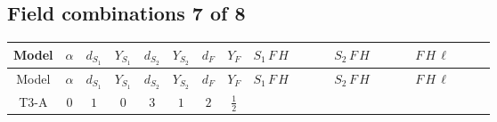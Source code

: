\documentclass[8pt]{article}
\begin{document}
\begin{landscape}
\subsection*{Field combinations 7 of 8}
\begin{longtable}{@{}cccccccc >{\raggedright\arraybackslash}p{0.21\linewidth} >{\raggedright\arraybackslash}p{0.21\linewidth} >{\raggedright\arraybackslash}p{0.21\linewidth}@{}}
\toprule
Model & $\alpha$ & $d_{S_1}$ & $Y_{S_1}$ & $d_{S_2}$ & $Y_{S_2}$ & $d_F$ & $Y_F$ & $S_1\,F\,H$ & $S_2\,F\,H$ & $F\,H\,\ell$ \\
\midrule
\endfirsthead
\toprule
Model & $\alpha$ & $d_{S_1}$ & $Y_{S_1}$ & $d_{S_2}$ & $Y_{S_2}$ & $d_F$ & $Y_F$ & $S_1\,F\,H$ & $S_2\,F\,H$ & $F\,H\,\ell$ \\
\midrule
\endhead
T3-A & $0$ & $1$ & $0$ & $3$ & $1$ & $2$ & $\frac{1}{2}$ & \scriptsize\adjustbox{max width=\linewidth}{$\begin{gathered} -2 \hbar  \log \left(\frac{\bar{\mu}^{2}}{M_F^2}\right) \overline{y_{1,i_1,r_1}} \overline{Y_{e,i_2,i_3}} H_{a_1} S_1 y_{1,i_2,r_1} Y_{e,i_1,i_3} H_{a_1}{}^{\dagger } S_1{}^{\dagger } \\ -2 \hbar  \log \left(\frac{\bar{\mu}^{2}}{M_F^2}\right) \overline{y_{1,i_1,r_1}} H_{a_2} S_1 y_{1,i_1,r_1} H_{a_1}{}^{\dagger } S_1{}^{\dagger } \mathcal{I}_{H1,a_1,a_2}{}^1 \lambda_{HS_1}^{(1)}^{(1)}\end{gathered}$} & \scriptsize\adjustbox{max width=\linewidth}{$\begin{gathered} -\frac{2 \hbar  \log \left(\frac{\bar{\mu}^{2}}{M_F^2}\right) \overline{y_{2,i_1,r_1}} \overline{Y_{e,i_2,i_3}} H_{a_1} S_{2,j_1} y_{2,i_2,r_1} Y_{e,i_1,i_3} H_{a_1}{}^{\dagger } S_{2,j_1}{}^{\dagger }}{\sqrt{3}} \\ -2 i \sqrt{\frac{2}{3}} \hbar  \log \left(\frac{\bar{\mu}^{2}}{M_F^2}\right) \overline{y_{2,i_1,r_1}} \overline{Y_{e,i_2,i_3}} H_{a_2} S_{2,j_2} y_{2,i_2,r_1} Y_{e,i_1,i_3} H_{a_1}{}^{\dagger } S_{2,j_1}{}^{\dagger } \mathcal{I}_{H2,a_1,a_2,j_1,j_2}{}^1 \\ -\frac{2 \hbar  \log \left(\frac{\bar{\mu}^{2}}{M_F^2}\right) \overline{y_{2,i_1,r_1}} H_{a_2} S_{2,j_2} y_{2,i_1,r_1} H_{a_1}{}^{\dagger } S_{2,j_1}{}^{\dagger } \mathcal{I}_{H2,a_1,a_2,j_1,j_2}{}^2 \lambda_{HS_2}^{(1)}^{(2)}}{\sqrt{3}}\end{gathered}$} & \scriptsize\adjustbox{max width=\linewidth}{$\begin{gathered} +\frac{2 \hbar  \log \left(\frac{\bar{\mu}^{2}}{M_F^2}\right) \overline{y_{1,i_1,r_1}} \overline{y_{2,i_2,r_1}} L_{a_4,i_2}{}^T\, C\, P_L\, L_{a_2,i_1} H_{a_1} H_{a_3} \lambda_5 \epsilon_{a_1,a_2} \epsilon_{a_3,a_4}}{\sqrt{3} M_F} \\ +\frac{2 \hbar  \log \left(\frac{\bar{\mu}^{2}}{M_F^2}\right) \overline{\lambda_5} \overline{L_{a_3,i_1}}\, C\, P_R\, \overline{L_{a_4,i_2}}{}^T y_{1,i_1,r_1} y_{2,i_2,r_1} \epsilon_{a_1,a_3} \epsilon_{a_2,a_4} H_{a_1}{}^{\dagger } H_{a_2}{}^{\dagger }}{\sqrt{3} M_F}\end{gathered}$} \\
\midrule
\bottomrule
\end{longtable}
\clearpage

\end{landscape}
\end{document}
